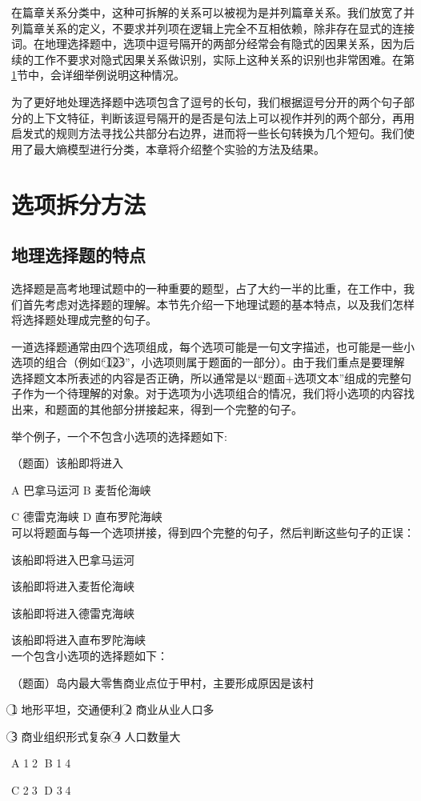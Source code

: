 \documentclass[master, winfont]{njuthesis}
\begin{document}
在篇章关系分类中，这种可拆解的关系可以被视为是并列篇章关系。我们放宽了并列篇章关系的定义，不要求并列项在逻辑上完全不互相依赖，除非存在显式的连接词。在地理选择题中，选项中逗号隔开的两部分经常会有隐式的因果关系，因为后续的工作不要求对隐式因果关系做识别，实际上这种关系的识别也非常困难。在第\ref{section:split_method}节中，会详细举例说明这种情况。

为了更好地处理选择题中选项包含了逗号的长句，我们根据逗号分开的两个句子部分的上下文特征，判断该逗号隔开的是否是句法上可以视作并列的两个部分，再用启发式的规则方法寻找公共部分右边界，进而将一些长句转换为几个短句。我们使用了最大熵模型进行分类，本章将介绍整个实验的方法及结果。

\section{选项拆分方法}
\label{section:split_method}
\subsection{地理选择题的特点}
选择题是高考地理试题中的一种重要的题型，占了大约一半的比重，在工作中，我们首先考虑对选择题的理解。本节先介绍一下地理试题的基本特点，以及我们怎样将选择题处理成完整的句子。

一道选择题通常由四个选项组成，每个选项可能是一句文字描述，也可能是一些小选项的组合（例如“\textcircled{1}\textcircled{2}\textcircled{3}”，小选项则属于题面的一部分）。由于我们重点是要理解选择题文本所表述的内容是否正确，所以通常是以“题面+选项文本”组成的完整句子作为一个待理解的对象。对于选项为小选项组合的情况，我们将小选项的内容找出来，和题面的其他部分拼接起来，得到一个完整的句子。

举个例子，一个不包含小选项的选择题如下:\par
（题面）该船即将进入\par
A 巴拿马运河   B 麦哲伦海峡\par
C 德雷克海峡   D 直布罗陀海峡\\


可以将题面与每一个选项拼接，得到四个完整的句子，然后判断这些句子的正误：\par
该船即将进入巴拿马运河\par
该船即将进入麦哲伦海峡\par
该船即将进入德雷克海峡\par
该船即将进入直布罗陀海峡\\

一个包含小选项的选择题如下：\par
（题面）岛内最大零售商业点位于甲村，主要形成原因是该村 \par
\textcircled{1} 地形平坦，交通便利   \textcircled{2} 商业从业人口多\par
\textcircled{3} 商业组织形式复杂     \textcircled{4} 人口数量大  \par
A \textcircled{1}\textcircled{2}  B \textcircled{1}\textcircled{4}\par
C \textcircled{2}\textcircled{3}  D \textcircled{3}\textcircled{4}\\
\end{document}
